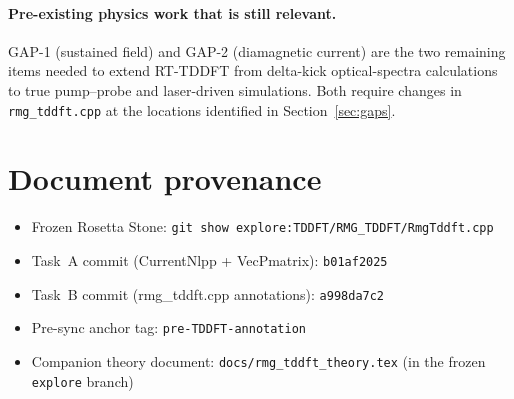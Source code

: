 \documentclass[11pt,letterpaper]{article}
\begin{document}
\paragraph{Pre-existing physics work that is still relevant.}
GAP-1 (sustained field) and GAP-2 (diamagnetic current) are the two
remaining items needed to extend RT-TDDFT from delta-kick optical-spectra
calculations to true pump--probe and laser-driven simulations.  Both
require changes in \texttt{rmg\_tddft.cpp} at the locations identified
in Section~\ref{sec:gaps}.

\section*{Document provenance}

\begin{itemize}[leftmargin=*]
  \item Frozen Rosetta Stone: \texttt{git show explore:TDDFT/RMG\_TDDFT/RmgTddft.cpp}
  \item Task~A commit (CurrentNlpp + VecPmatrix): \texttt{b01af2025}
  \item Task~B commit (rmg\_tddft.cpp annotations): \texttt{a998da7c2}
  \item Pre-sync anchor tag: \texttt{pre-TDDFT-annotation}
  \item Companion theory document: \texttt{docs/rmg\_tddft\_theory.tex}
        (in the frozen \texttt{explore} branch)
\end{itemize}
\end{document}
